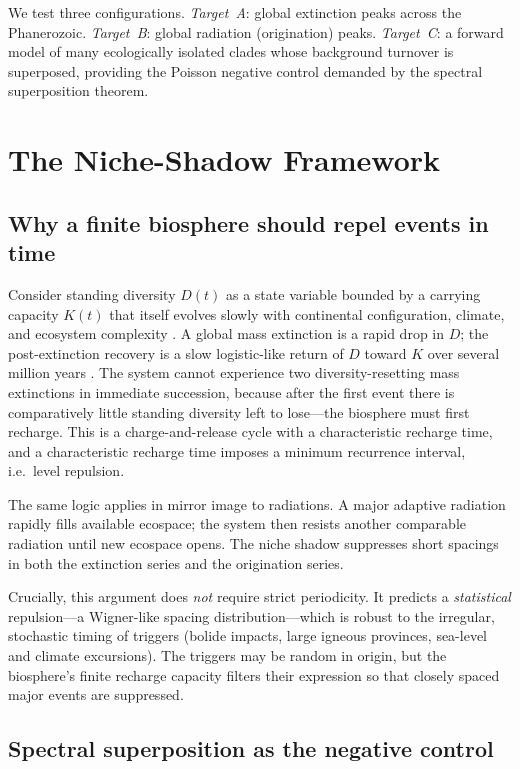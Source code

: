 \documentclass[12pt,a4paper]{article}
\begin{document}
We test three configurations. \emph{Target~A}: global extinction peaks across the Phanerozoic. \emph{Target~B}: global radiation (origination) peaks. \emph{Target~C}: a forward model of many ecologically isolated clades whose background turnover is superposed, providing the Poisson negative control demanded by the spectral superposition theorem.

\section{The Niche-Shadow Framework}

\subsection{Why a finite biosphere should repel events in time}

Consider standing diversity $D(t)$ as a state variable bounded by a carrying capacity $K(t)$ that itself evolves slowly with continental configuration, climate, and ecosystem complexity \citep{sepkoski1984}. A global mass extinction is a rapid drop in $D$; the post-extinction recovery is a slow logistic-like return of $D$ toward $K$ over several million years \citep{erwin1998,sahney2008}. The system cannot experience two diversity-resetting mass extinctions in immediate succession, because after the first event there is comparatively little standing diversity left to lose---the biosphere must first recharge. This is a charge-and-release cycle with a characteristic recharge time, and a characteristic recharge time imposes a minimum recurrence interval, i.e.\ level repulsion.

The same logic applies in mirror image to radiations. A major adaptive radiation rapidly fills available ecospace; the system then resists another comparable radiation until new ecospace opens. The niche shadow suppresses short spacings in both the extinction series and the origination series.

Crucially, this argument does \emph{not} require strict periodicity. It predicts a \emph{statistical} repulsion---a Wigner-like spacing distribution---which is robust to the irregular, stochastic timing of triggers (bolide impacts, large igneous provinces, sea-level and climate excursions). The triggers may be random in origin, but the biosphere's finite recharge capacity filters their expression so that closely spaced major events are suppressed.

\subsection{Spectral superposition as the negative control}
\end{document}
